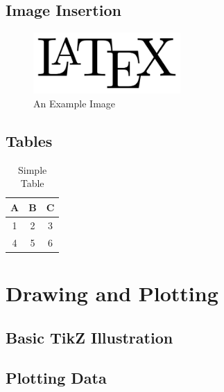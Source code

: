 \documentclass[12pt,a4paper]{article}
\begin{document}
\subsection{Image Insertion}
\begin{figure}[h!]
  \centering
  \includegraphics[width=0.5\textwidth]{LaTeX_logo.svg.png}
  \caption{An Example Image}
  \label{fig:example}
\end{figure}

\subsection{Tables}
\begin{table}[h!]
  \centering
  \begin{tabular}{|c|c|c|}
    \hline
    A & B & C \\
    \hline
    1 & 2 & 3 \\
    \hline
    4 & 5 & 6 \\
    \hline
  \end{tabular}
  \caption{Simple Table}
  \label{tab:simple}
\end{table}

\section{Drawing and Plotting}
\subsection{Basic TikZ Illustration}

\subsection{Plotting Data}
\end{document}

